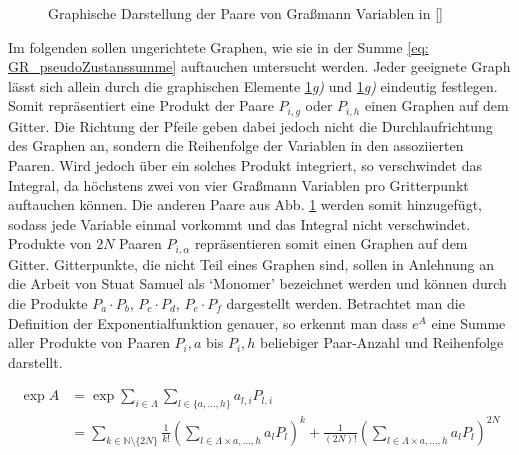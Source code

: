 \begin{figure}[h!]
    \centering
    
    \caption{Graphische Darstellung der Paare von Graßmann Variablen in \eqref{} }
    \label{Abb: Graphische Interpretation Graßmann Paare}
\end{figure}

\noindent Im folgenden sollen ungerichtete Graphen, wie sie in der Summe \eqref{eq: GR_pseudoZustanssumme} auftauchen untersucht werden. Jeder geeignete Graph lässt sich allein durch die graphischen Elemente \ref{Abb: Graphische Interpretation Graßmann Paare}\textit{g)} und \ref{Abb: Graphische Interpretation Graßmann Paare}\textit{g)} eindeutig festlegen. Somit repräsentiert eine Produkt der Paare $P_{i,g}$ oder $P_{i,h}$ einen Graphen auf dem Gitter. Die Richtung der Pfeile geben dabei jedoch nicht die Durchlaufrichtung des Graphen an, sondern die Reihenfolge der Variablen in den assoziierten Paaren. Wird jedoch über ein solches Produkt integriert, so verschwindet das Integral, da höchstens zwei von vier Graßmann Variablen pro Gritterpunkt auftauchen können. Die anderen Paare aus Abb. \ref{Abb: Graphische Interpretation Graßmann Paare} werden somit hinzugefügt, sodass jede Variable einmal vorkommt und das Integral nicht verschwindet. Produkte von $2N$ Paaren $P_{i,\alpha}$ repräsentieren somit einen Graphen auf dem Gitter. Gitterpunkte, die nicht Teil eines Graphen sind, sollen in Anlehnung an die Arbeit von Stuat Samuel als `Monomer' bezeichnet werden und können durch die Produkte $P_a \cdot P_b$, $P_c \cdot P_d$, $P_e \cdot P_f$ dargestellt werden. Betrachtet man die Definition der Exponentialfunktion genauer, so erkennt man dass $e^A$ eine Summe aller Produkte von Paaren $P_i,a$ bis $P_i,h$ beliebiger Paar-Anzahl und Reihenfolge darstellt. 

\begin{align}
\exp{A} &= \exp{\sum_{i \in\Lambda} \sum_{l \in \{a,\dots, h\}} a_{l, i} P_{l, i }} \\
        &=\sum_{k\in\mathbb N \setminus \{2N\}} \frac{1}{k!}\left( \sum_{l \in \Lambda \times {a,\dots,h}} a_{l} P_{l}\right)^k + \frac{1}{(2N)!} \left(\sum_{l \in \Lambda \times {a,\dots,h}} a_{l} P_{l}\right)^{2N} \label{eq: exp_sum_combi}
\end{align}



